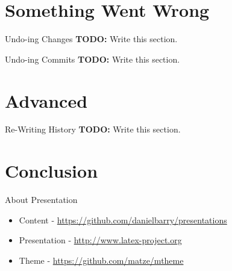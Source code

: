 \documentclass{beamer}
\begin{document}
  \section{Something Went Wrong}
  \begin{frame}{Undo-ing Changes}
    \textbf{TODO:} Write this section.
  \end{frame}
  \begin{frame}{Undo-ing Commits}
    \textbf{TODO:} Write this section.
  \end{frame}
  \section{Advanced}
  \begin{frame}{Re-Writing History}
    \textbf{TODO:} Write this section.
  \end{frame}
  \section{Conclusion}
  \begin{frame}{About Presentation}
    \begin{itemize}
      \item Content - \url{https://github.com/danielbarry/presentations}
      \item Presentation - \url{http://www.latex-project.org}
      \item Theme - \url{https://github.com/matze/mtheme}
    \end{itemize}
  \end{frame}
\end{document}
